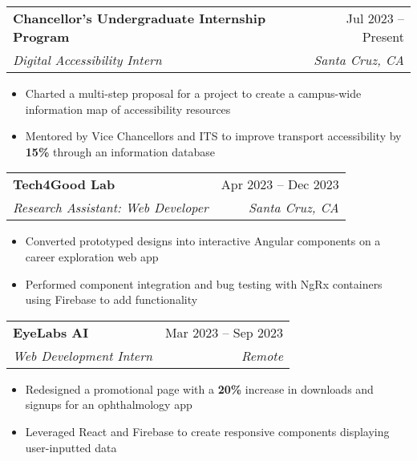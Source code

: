 \documentclass[letterpaper,11pt]{article}
\makeatletter
\newcommand{\resumeItem}[1]{
  \item\small{
    {#1 \vspace{-2pt}}
  }
}
\newcommand{\resumeSubheading}[4]{
  \vspace{-2pt}\item
    \begin{tabular*}{0.97\textwidth}[t]{l@{\extracolsep{\fill}}r}
      \textbf{#1} & #2 \\
      \textit{\small#3} & \textit{\small #4} \\
    \end{tabular*}\vspace{-7pt}
}
\newcommand{\resumeItemListStart}{\begin{itemize}}
\newcommand{\resumeItemListEnd}{\end{itemize}\vspace{-5pt}}
\makeatother
\begin{document}
\resumeSubheading
{Chancellor's Undergraduate Internship Program}{Jul 2023 -- Present}
{Digital Accessibility Intern}{Santa Cruz, CA}
\resumeItemListStart
\resumeItem{Charted a multi-step proposal for a project to create a campus-wide information map of accessibility resources}
\resumeItem{Mentored by Vice Chancellors and ITS to improve transport accessibility by \textbf{15\%} through an information database}
\resumeItemListEnd

\resumeSubheading
{Tech4Good Lab}{Apr 2023 -- Dec 2023}
{Research Assistant: Web Developer}{Santa Cruz, CA}
\resumeItemListStart
\resumeItem{Converted prototyped designs into interactive Angular components on a career exploration web app}
\resumeItem{Performed component integration and bug testing with NgRx containers using Firebase to add functionality}
\resumeItemListEnd

\resumeSubheading
{EyeLabs AI}{Mar 2023 -- Sep 2023}
{Web Development Intern}{Remote}
\resumeItemListStart
\resumeItem{Redesigned a promotional page with a \textbf{20\%} increase in downloads and signups for an ophthalmology app}
\resumeItem{Leveraged React and Firebase to create responsive components displaying user-inputted data}
\resumeItemListEnd



\end{document}
